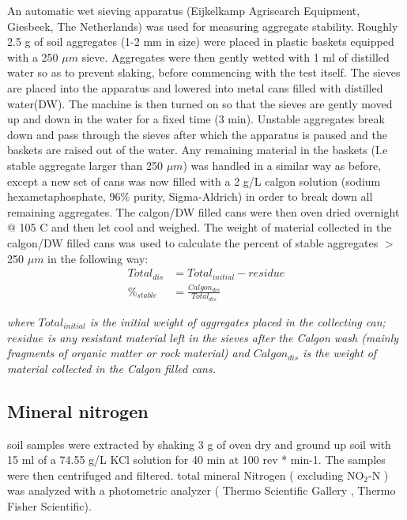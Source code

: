 \documentclass[12pt]{report}
\begin{document}
An automatic wet sieving apparatus (Eijkelkamp Agrisearch Equipment, Giesbeek, The Netherlands) was used for measuring aggregate stability. Roughly 2.5 g of soil aggregates (1-2 mm in size) were placed in plastic baskets equipped with a 250 $ \mu m $ sieve. Aggregates were then gently wetted with 1 ml of distilled water so as to prevent slaking, before commencing with the test itself. The sieves are  placed into the apparatus and lowered into metal cans filled with distilled water(DW). The machine is then turned on so that the sieves are gently moved up and down in the water for a fixed time (3 min). Unstable aggregates break down and pass through the sieves after which the apparatus is paused and the baskets are raised out of the water. Any remaining material in the baskets (I.e stable aggregate larger than 250 $ \mu m $) was handled in a similar way as before, except a new set of cans was now filled with a 2 g/L calgon solution (sodium hexametaphosphate, 96\% purity, Sigma-Aldrich) in order to break down all remaining aggregates. The calgon/DW filled cans were then oven dried overnight @ 105 C and  then let cool and weighed. The weight of material collected in the calgon/DW filled cans was used to calculate the percent of stable aggregates $ > $250 $ \mu m $ in the following way:\\

\begin{align}
Total_{dis} &= Total_{initial} - residue\\
\%_{stable} &= \frac{Calgon_{dis}}{Total_{dis}}
\end{align}

\begin{adjustwidth}{50pt}{50pt}
	\begin{footnotesize}
		\textit{where $ Total_{initial} $ is the initial weight of aggregates placed in the collecting can; $ residue $ is any resistant material left in the sieves after the Calgon wash (mainly fragments of organic matter  or rock material) and $ Calgon_{dis} $ is the weight of material collected in the Calgon filled cans. 
		}\\
	\end{footnotesize}
\end{adjustwidth} 

\subsection{Mineral nitrogen}

soil samples were extracted by shaking 3 g of oven dry and ground up soil with 15 ml of a 74.55 g/L KCl solution for 40 min at 100 rev * min-1. The samples were then centrifuged and filtered. total mineral Nitrogen ( excluding NO$_2$-N ) was analyzed with a photometric analyzer ( Thermo Scientific Gallery , Thermo Fisher Scientific). 
\end{document}
